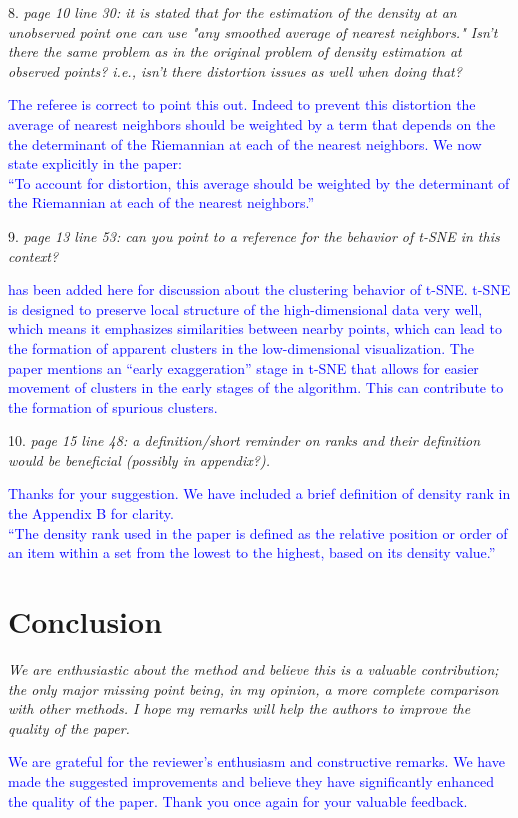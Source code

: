 \documentclass{article}
\begin{document}
8. \textit{page 10 line 30: it is stated that for the estimation of the density at an unobserved point one can use "any smoothed average of nearest neighbors." Isn't there the same problem as in the original problem of density estimation at observed points? i.e., isn't there distortion issues as well when doing that?}

   \textcolor{blue}{The referee is correct to point this out. Indeed to prevent this distortion the average of nearest neighbors should be weighted by a term that depends on the the determinant of the Riemannian at each of the nearest neighbors. We now state explicitly in the paper:\\
   ``To account for distortion, this average should be weighted by the determinant of the Riemannian at each of the nearest neighbors.''}

9. \textit{page 13 line 53: can you point to a reference for the behavior of t-SNE in this context?}

   \textcolor{blue}{\autocite{cai2022-tsne} has been added here for discussion about the clustering behavior of t-SNE. t-SNE is designed to preserve local structure of the high-dimensional data very well, which means it emphasizes similarities between nearby points, which can lead to the formation of apparent clusters in the low-dimensional visualization. The paper mentions an ``early exaggeration'' stage in t-SNE that allows for easier movement of clusters in the early stages of the algorithm. This can contribute to the formation of spurious clusters.}

10. \textit{page 15 line 48: a definition/short reminder on ranks and their definition would be beneficial (possibly in appendix?).}

   \textcolor{blue}{
   Thanks for your suggestion. We have included a brief definition of density rank in the Appendix B for clarity. \\
   ``The density rank used in the paper is defined as the relative position or order of an item within a set from the lowest to the highest, based on its density value.''
   }

\section*{Conclusion}

\textit{We are enthusiastic about the method and believe this is a valuable contribution; the only major missing point being, in my opinion, a more complete comparison with other methods. I hope my remarks will help the authors to improve the quality of the paper.}

\vspace{0.5cm}

\textcolor{blue}{We are grateful for the reviewer's enthusiasm and constructive remarks. We have made the suggested improvements and believe they have significantly enhanced the quality of the paper. Thank you once again for your valuable feedback.}

% 
% 
\printbibliography
\end{document}
